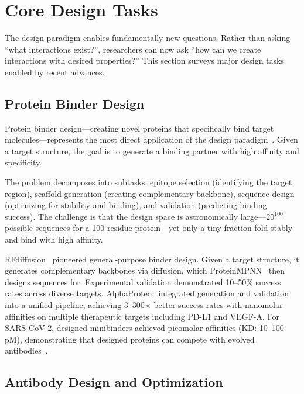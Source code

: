 \section{Core Design Tasks}
\label{sec:tasks}

The design paradigm enables fundamentally new questions. Rather than asking ``what interactions exist?'', researchers can now ask ``how can we create interactions with desired properties?'' This section surveys major design tasks enabled by recent advances.

\subsection{Protein Binder Design}

Protein binder design---creating novel proteins that specifically bind target molecules---represents the most direct application of the design paradigm~\cite{watson2023rfdiffusion,zambaldi2024alphaproteo}. Given a target structure, the goal is to generate a binding partner with high affinity and specificity.

The problem decomposes into subtasks: epitope selection (identifying the target region), scaffold generation (creating complementary backbone), sequence design (optimizing for stability and binding), and validation (predicting binding success). The challenge is that the design space is astronomically large---$20^{100}$ possible sequences for a 100-residue protein---yet only a tiny fraction fold stably and bind with high affinity.

RFdiffusion~\cite{watson2023rfdiffusion} pioneered general-purpose binder design. Given a target structure, it generates complementary backbones via diffusion, which ProteinMPNN~\cite{dauparas2022proteinmpnn} then designs sequences for. Experimental validation demonstrated 10--50\% success rates across diverse targets. AlphaProteo~\cite{zambaldi2024alphaproteo} integrated generation and validation into a unified pipeline, achieving 3--300$\times$ better success rates with nanomolar affinities on multiple therapeutic targets including PD-L1 and VEGF-A. For SARS-CoV-2, designed minibinders achieved picomolar affinities (KD: 10--100 pM), demonstrating that designed proteins can compete with evolved antibodies~\cite{watson2023rfdiffusion}.

\subsection{Antibody Design and Optimization}

